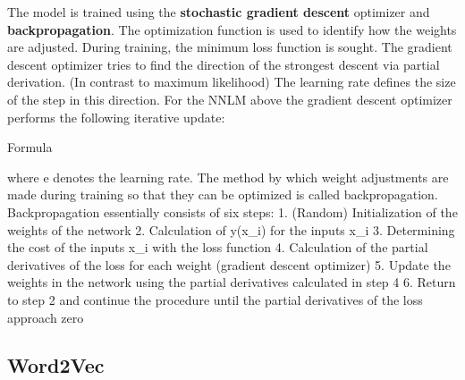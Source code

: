 \documentclass[]{krantz}
\begin{document}
The model is trained using the \textbf{stochastic gradient descent} optimizer and \textbf{backpropagation}. The optimization function is used to identify how the weights are adjusted. During training, the minimum loss function is sought. The gradient descent optimizer tries to find the direction of the strongest descent via partial derivation. (In contrast to maximum likelihood) The learning rate defines the size of the step in this direction. For the NNLM above the gradient descent optimizer performs the following iterative update:

Formula

where e denotes the learning rate.
The method by which weight adjustments are made during training so that they can be optimized is called backpropagation. Backpropagation essentially consists of six steps:
1. (Random) Initialization of the weights of the network
2. Calculation of y(x\_i) for the inputs x\_i
3. Determining the cost of the inputs x\_i with the loss function
4. Calculation of the partial derivatives of the loss for each weight (gradient descent optimizer)
5. Update the weights in the network using the partial derivatives calculated in step 4
6. Return to step 2 and continue the procedure until the partial derivatives of the loss approach zero

\hypertarget{word2vec}{%
\subsection{Word2Vec}\label{word2vec}}
\end{document}
